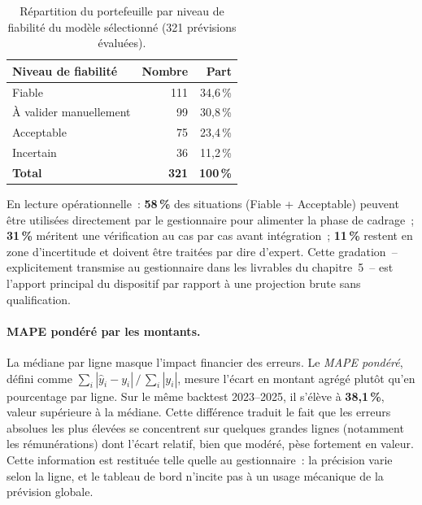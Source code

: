 \begin{table}[h]
\centering
\caption{R\'epartition du portefeuille par niveau de fiabilit\'e du mod\`ele s\'electionn\'e (321 pr\'evisions \'evalu\'ees).}
\label{tab:reliability}
\begin{tabular}{lrr}
\toprule
\textbf{Niveau de fiabilit\'e} & \textbf{Nombre} & \textbf{Part} \\
\midrule
Fiable                       & 111 & 34{,}6\,\% \\
\`A valider manuellement     & 99  & 30{,}8\,\% \\
Acceptable                   & 75  & 23{,}4\,\% \\
Incertain                    & 36  & 11{,}2\,\% \\
\midrule
\textbf{Total} & \textbf{321} & \textbf{100\,\%} \\
\bottomrule
\end{tabular}
\end{table}

En lecture op\'erationnelle~: \textbf{58\,\%} des situations
(Fiable + Acceptable) peuvent \^etre utilis\'ees directement par le
gestionnaire pour alimenter la phase de cadrage~; \textbf{31\,\%} m\'eritent
une v\'erification au cas par cas avant int\'egration~; \textbf{11\,\%}
restent en zone d'incertitude et doivent \^etre trait\'ees par dire d'expert.
Cette gradation~-- explicitement transmise au gestionnaire dans les
livrables du chapitre~5~-- est l'apport principal du dispositif par rapport
\`a une projection \og brute \fg{} sans qualification.

\paragraph{MAPE pond\'er\'e par les montants.}
La m\'ediane par ligne masque l'impact financier des erreurs. Le
\emph{MAPE pond\'er\'e}, d\'efini comme $\sum_i |\widehat{y}_i - y_i|
\,/\, \sum_i |y_i|$, mesure l'\'ecart en montant agr\'eg\'e plut\^ot
qu'en pourcentage par ligne. Sur le m\^eme backtest 2023--2025, il
s'\'el\`eve \`a \textbf{38{,}1\,\%}, valeur sup\'erieure \`a la m\'ediane.
Cette diff\'erence traduit le fait que les erreurs absolues les plus
\'elev\'ees se concentrent sur quelques grandes lignes (notamment les
r\'emun\'erations) dont l'\'ecart relatif, bien que mod\'er\'e, p\`ese
fortement en valeur. Cette information est restitu\'ee telle quelle au
gestionnaire~: la pr\'ecision varie selon la ligne, et le tableau de
bord n'incite pas \`a un usage m\'ecanique de la pr\'evision globale.

